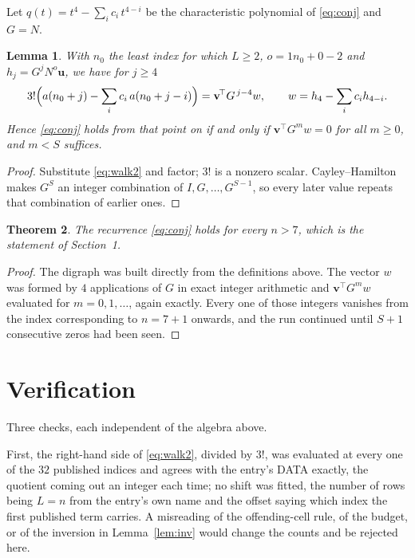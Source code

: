 \documentclass[11pt,a4paper]{article}
\theoremstyle{plain}
\newtheorem{theorem}{Theorem}
\newtheorem{lemma}[theorem]{Lemma}
\theoremstyle{definition}
\begin{document}
Let $q(t)=t^{4}-\sum_i c_i\,t^{4-i}$ be the characteristic polynomial of
\eqref{eq:conj} and $G=N$.

\begin{lemma}\label{lem:crit}
With $n_0$ the least index for which $L\ge2$, $o=1n_0+0-2$ and
$h_j=G^{j}N^{o}\mathbf{u}$, we have for $j\ge4$
\[
3!\Bigl(a(n_0+j)-\sum_i c_i\,a(n_0+j-i)\Bigr)=\mathbf{v}^{\!\top}G^{\,j-4}w,
\qquad w=h_{4}-\sum_i c_i h_{4-i} .
\]
Hence \eqref{eq:conj} holds from that point on if and only if
$\mathbf{v}^{\!\top}G^{m}w=0$ for all $m\ge0$, and $m<S$ suffices.
\end{lemma}

\begin{proof}
Substitute \eqref{eq:walk2} and factor; $3!$ is a nonzero scalar. Cayley--Hamilton
makes $G^{S}$ an integer combination of $I,G,\dots,G^{S-1}$, so every later value repeats
that combination of earlier ones.
\end{proof}

\begin{theorem}
The recurrence \eqref{eq:conj} holds for every $n>7$, which is the statement of
Section~1.
\end{theorem}

\begin{proof}
The digraph was built directly from the definitions above. The vector $w$ was formed by
$4$ applications of $G$ in exact integer arithmetic and $\mathbf{v}^{\!\top}G^{m}w$
evaluated for $m=0,1,\dots$, again exactly. Every one of those integers vanishes from the
index corresponding to $n=7+1$ onwards, and the run continued until $S+1$ consecutive
zeros had been seen.
\end{proof}

\section{Verification}

Three checks, each independent of the algebra above.

First, the right-hand side of \eqref{eq:walk2}, divided by $3!$, was evaluated at every
one of the $32$ published indices and agrees with the entry's DATA exactly, the quotient
coming out an integer each time; no shift was fitted, the number of rows being
$L=n$ from the entry's own name and the offset saying which index the first published
term carries. A misreading of the offending-cell rule, of the budget, or of the inversion in
Lemma~\ref{lem:inv} would change the counts and be rejected here.
\end{document}
